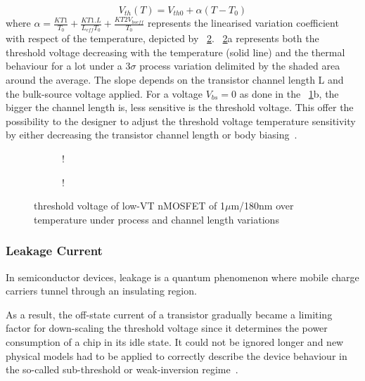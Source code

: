 \begin{equation}
V_{th}(T) = V_{th0} + \alpha (T - T_0)
\end{equation}
where \(\alpha = \frac{KT1}{T_0}+\frac{KT1.L}{L_{eff} T_0}+\frac{KT2 V_{bseff}}{T_0}\) represents the linearised variation coefficient with respect of the temperature, depicted by \figurename~\ref{fig:vth_nel}. \figurename~\ref{fig:vth_nel}a represents both the threshold voltage decreasing with the temperature (solid line) and the thermal behaviour for a lot under a 3\(\sigma \) process variation delimited by the shaded area around the average. The slope depends on the transistor channel length L and the bulk-source voltage applied. For a voltage \(V_{bs} = 0 \) as done in the \figurename~\ref{fig:vth_nel_L}b, the bigger the channel length is, less sensitive is the threshold voltage. This offer the possibility to the designer to adjust the threshold voltage temperature sensitivity by either decreasing the transistor channel length or body biasing~\cite{Kumar2008}.

\begin{figure}[!ht]
    \centering
    \begin{subfigure}[b]{0.48\textwidth}
        \resizebox {\textwidth} {!} { 
            
        }
    \end{subfigure}
    \begin{subfigure}[b]{0.48\textwidth}
        \resizebox {\textwidth} {!} { 
            
        }
        \label{fig:vth_nel_L}
    \end{subfigure}
    \caption{threshold voltage of low-VT nMOSFET of 1\(\mu \)m/180nm over temperature under process and channel length variations}
    \label{fig:vth_nel}
\end{figure}

\subsubsection{Leakage Current}        %
In semiconductor devices, leakage is a quantum phenomenon where mobile charge carriers tunnel through an insulating region.

As a result, the off-state current of a transistor gradually became a limiting factor for down-scaling the threshold voltage since it determines the power consumption of a chip in its idle state. It could not be ignored longer and new physical models had to be applied to correctly describe the device behaviour in the so-called sub-threshold or weak-inversion regime~\cite{Cheng21997,Enz1995,Joardar1998}.

